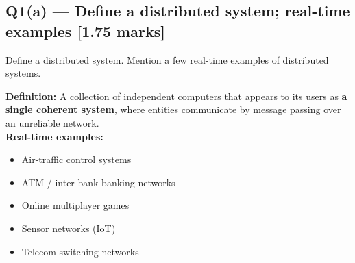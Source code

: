 \documentclass[12pt, a4paper]{article}
\newenvironment{qbox}{\begin{mdframed}[style=qframe]}{\end{mdframed}}
\newenvironment{solbox}{\begin{mdframed}[style=solframe]}{\end{mdframed}}
\newcommand{\qmarks}[1]{\hfill\textbf{\color{orange!70!black}[#1 marks]}}
\begin{document}
\subsection{Q1(a) — Define a distributed system; real-time examples \texorpdfstring{\qmarks{1.75}}{}}
\begin{qbox}Define a distributed system. Mention a few real-time examples of distributed systems.\end{qbox}
\begin{solbox}
\textbf{Definition:} A collection of independent computers that appears to its users as \textbf{a single coherent system}, where entities communicate by message passing over an unreliable network.\\[4pt]
\textbf{Real-time examples:}
\begin{itemize}[leftmargin=1.4cm, itemsep=1pt]
  \item Air-traffic control systems
  \item ATM / inter-bank banking networks
  \item Online multiplayer games
  \item Sensor networks (IoT)
  \item Telecom switching networks
\end{itemize}
\end{solbox}

\end{document}
